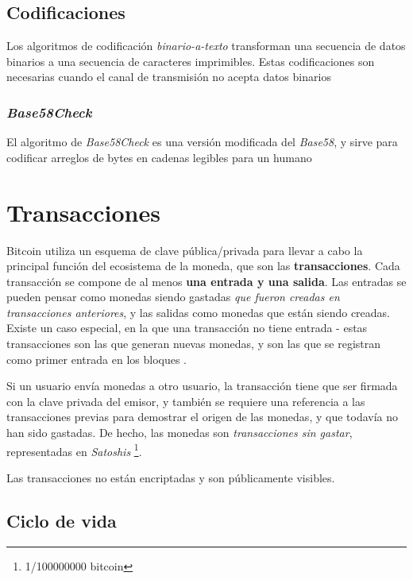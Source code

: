 \subsection{Codificaciones}

Los algoritmos de codificación \emph{binario-a-texto} transforman una secuencia de datos binarios a una secuencia de caracteres imprimibles. Estas codificaciones son necesarias cuando el canal de transmisión no acepta datos binarios \autocite{WikipediaEncoding} 

\subsubsection{\emph{Base58Check}}

El algoritmo de \emph{Base58Check} es una versión modificada del \emph{Base58}, y sirve para codificar arreglos de bytes en cadenas legibles para un humano \autocite{WikipediaBase58Check}  

\section{Transacciones}

Bitcoin utiliza un esquema de clave pública/privada para llevar a cabo la principal función del ecosistema de la moneda, que son las \textbf{transacciones}. Cada  transacción se compone de al menos \textbf{una entrada y una salida}. Las entradas se pueden pensar como monedas siendo gastadas \emph{que fueron creadas en transacciones anteriores}, y las salidas como monedas que están siendo creadas. Existe un caso especial, en la que una transacción no tiene entrada - estas transacciones son las que generan nuevas monedas, y son las que se registran como primer entrada en los bloques \autocite{MasteringBlockchainTransactions}. 

Si un usuario envía monedas a otro usuario, la transacción tiene que ser firmada con la clave privada del emisor, y también se requiere una referencia a las transacciones previas para demostrar el origen de las monedas, y que todavía no han sido gastadas. De hecho, las monedas son \emph{transacciones sin gastar}, representadas en \emph{Satoshis} \footnote{1/100000000 bitcoin}.

Las transacciones no están encriptadas y son públicamente visibles.

\subsection{Ciclo de vida}

